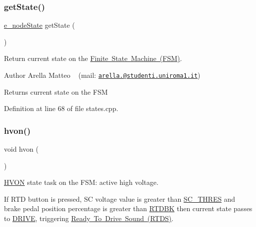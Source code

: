 \subsubsection{\texorpdfstring{get\+State()}{getState()}}
{\footnotesize\ttfamily \mbox{\hyperlink{group__stages__group_ga29e04432d3efcac24a5ae62572a6e8f2}{e\+\_\+node\+State}} get\+State (\begin{DoxyParamCaption}{ }\end{DoxyParamCaption})}



Return current state on the \mbox{\hyperlink{_f_s_m_page}{Finite State Machine (F\+SM)}}. 

\begin{DoxyAuthor}{Author}
Arella Matteo ~\newline
 (mail\+: \href{mailto:arella.1646983@studenti.uniroma1.it}{\tt arella.@studenti.\+uniroma1.\+it})
\end{DoxyAuthor}
\begin{DoxyReturn}{Returns}
current state on the F\+SM 
\end{DoxyReturn}


Definition at line 68 of file states.\+cpp.

\mbox{\label{group__stages__group_ga6fada8f571df828c8fe6b920e2558c37}} 
\subsubsection{\texorpdfstring{hvon()}{hvon()}}
{\footnotesize\ttfamily void hvon (\begin{DoxyParamCaption}{ }\end{DoxyParamCaption})}



\mbox{\hyperlink{_f_s_m_page_HVON}{H\+V\+ON}} state task on the F\+SM\+: active high voltage. 

If R\+TD button is pressed, SC voltage value is greater than \mbox{\hyperlink{group__stages__group_ga9688af4f17ae88b4d149269d71b7ff1f}{S\+C\+\_\+\+T\+H\+R\+ES}} and brake pedal position percentage is greater than \mbox{\hyperlink{group__stages__group_ga87841f6a3eeb660263b624e20c4f072f}{R\+T\+D\+BK}} then current state passes to \mbox{\hyperlink{_f_s_m_page_DRIVE}{D\+R\+I\+VE}}, triggering \mbox{\hyperlink{_r_t_d_s}{Ready To Drive Sound (R\+T\+DS)}}.

